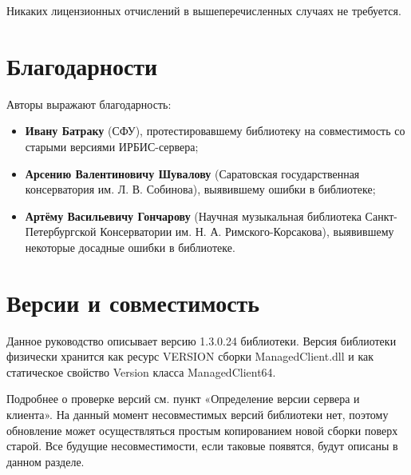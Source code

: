 Никаких лицензионных отчислений в вышеперечисленных случаях не требуется. 

\section*{Благодарности}

Авторы выражают благодарность:

\begin{itemize}
	\item \textbf{Ивану Батраку} (СФУ), протестировавшему библиотеку на совместимость со старыми версиями ИРБИС-сервера;
	\item \textbf{Арсению Валентиновичу Шувалову} (Саратовская государственная консерватория им. Л. В. Собинова), выявившему ошибки в библиотеке;
	\item \textbf{Артёму Васильевичу Гончарову} (Научная музыкальная библиотека Санкт-Петер\-бургской Консерватории им. Н. А. Римского-Корсакова), выявившему некоторые досадные ошибки в библиотеке.
\end{itemize}

\section*{Версии и совместимость}

Данное руководство описывает версию 1.3.0.24 библиотеки. Версия библиотеки физически хранится как ресурс VERSION сборки ManagedClient.dll и как статическое свойство Version класса ManagedClient64.

Подробнее о проверке версий см. пункт «Определение версии сервера и клиента».
На данный момент несовместимых версий библиотеки нет, поэтому обновление может осуществляться простым копированием новой сборки поверх старой.
Все будущие несовместимости, если таковые появятся, будут описаны в данном разделе.


